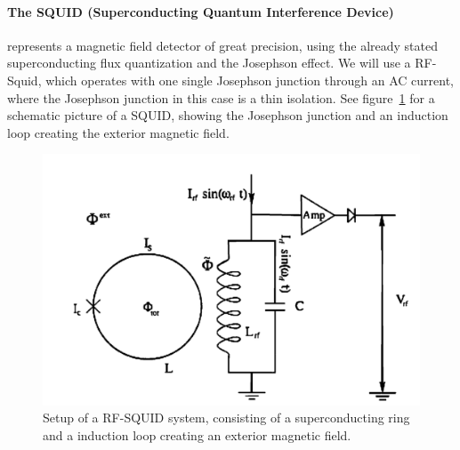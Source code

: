 \paragraph{The SQUID (Superconducting Quantum Interference Device)} represents a magnetic field
detector of great precision, using the already stated superconducting flux quantization and
the Josephson effect. We will use a RF-Squid, which operates with one single Josephson junction%
through an AC current, where the Josephson junction in this case is a thin isolation. 
See figure~\ref{fig:squid1} for a schematic picture of a SQUID, showing the Josephson junction and 
an induction loop creating the exterior magnetic field.
\begin{figure}[H]
    \centering
    \includegraphics[width=1\linewidth]{figures/squid1}
    \caption{Setup of a RF-SQUID system, consisting of a superconducting ring and a induction loop creating
        an exterior magnetic field.}
    \label{fig:squid1}
\end{figure}


